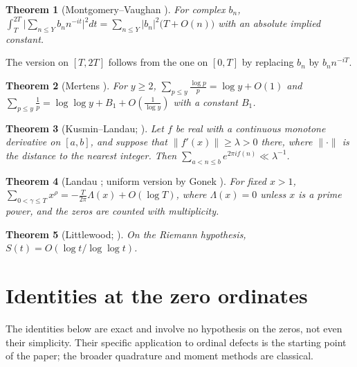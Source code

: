 \documentclass[11pt,reqno]{amsart}
\theoremstyle{plain}\newtheorem{theorem}{Theorem}[section]\newtheorem{proposition}[theorem]{Proposition}\newtheorem{lemma}[theorem]{Lemma}\newtheorem{corollary}[theorem]{Corollary}
\theoremstyle{definition}\newtheorem{hypothesis}[theorem]{Hypothesis}\newtheorem{definition}[theorem]{Definition}
\theoremstyle{remark}\newtheorem{remark}[theorem]{Remark}\newtheorem{experiment}[theorem]{Experiment}\newtheorem{question}[theorem]{Question}\newtheorem{heuristic}[theorem]{Heuristic}\newtheorem{conjecture}[theorem]{Conjecture}
\begin{document}
\begin{theorem}[Montgomery--Vaughan {\cite[Cor.~3]{MontgomeryVaughan1974}}]\label{thm:known_MV}
For complex $b_n$, $\int_T^{2T}\bigl|\sum_{n\le Y}b_nn^{-it}\bigr|^2dt=\sum_{n\le Y}|b_n|^2\bigl(T+O(n)\bigr)$ with an absolute implied constant.
\end{theorem}
The version on $[T,2T]$ follows from the one on $[0,T]$ by replacing $b_n$ by $b_nn^{-iT}$.

\begin{theorem}[Mertens {\cite{Mertens1874}}]\label{thm:known_mertens}
For $y\ge2$, $\sum_{p\le y}\frac{\log p}p=\log y+O(1)$ and $\sum_{p\le y}\frac1p=\log\log y+B_1+O(\frac1{\log y})$ with a constant $B_1$.
\end{theorem}

\begin{theorem}[Kusmin--Landau; {\cite[Thm.~2.1]{GrahamKolesnik1991}}]\label{thm:known_KL}
Let $f$ be real with a continuous monotone derivative on $[a,b]$, and suppose that $\|f'(x)\|\ge\lambda>0$ there, where $\|\cdot\|$ is the distance to the nearest integer. Then $\sum_{a<n\le b}e^{2\pi if(n)}\ll\lambda^{-1}$.
\end{theorem}

\begin{theorem}[Landau {\cite{Landau1912}}; uniform version by Gonek {\cite{Gonek1993}}]\label{thm:known_landau}
For fixed $x>1$, $\sum_{0<\gamma\le T}x^{\rho}=-\frac T{2\pi}\Lambda(x)+O(\log T)$, where $\Lambda(x)=0$ unless $x$ is a prime power, and the zeros are counted with multiplicity.
\end{theorem}

\begin{theorem}[Littlewood; {\cite[Thm.~14.13]{Titchmarsh1986}}]\label{thm:known_RH_S}
On the Riemann hypothesis, $S(t)=O(\log t/\log\log t)$.
\end{theorem}

\section{Identities at the zero ordinates}
\label{sec:identities}

The identities below are exact and involve no hypothesis on the zeros, not even their simplicity. Their specific application to ordinal defects is the starting point of the paper; the broader quadrature and moment methods are classical.
\end{document}
